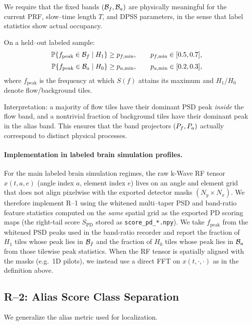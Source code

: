 We require that the fixed bands $(\mathcal{B}_f,\mathcal{B}_a)$ are physically meaningful for the current PRF, slow--time length $T$, and DPSS parameters, in the sense that label statistics show actual occupancy.

On a held--out labeled sample:
\begin{align}
\mathbb{P}\!\left\{f_{\mathrm{peak}}\in\mathcal{B}_f \;\middle|\; H_1\right\} &\ge p_{f,\min},\qquad p_{f,\min}\in [0.5,0.7],\\[0.5ex]
\mathbb{P}\!\left\{f_{\mathrm{peak}}\in\mathcal{B}_a \;\middle|\; H_0\right\} &\ge p_{a,\min},\qquad p_{a,\min}\in [0.2,0.3],
\end{align}
where $f_{\mathrm{peak}}$ is the frequency at which $S(f)$ attains its maximum and $H_1$/$H_0$ denote flow/background tiles.

Interpretation: a majority of flow tiles have their dominant PSD peak \emph{inside} the flow band, and a nontrivial fraction of background tiles have their dominant peak in the alias band. This ensures that the band projectors $(P_f,P_a)$ actually correspond to distinct physical processes.

\paragraph{Implementation in labeled brain simulation profiles.}
For the main labeled brain simulation regimes, the raw k-Wave RF tensor $x(t,a,e)$ (angle index $a$, element index $e$) lives on an angle and element grid that does not align pixelwise with the exported detector masks $(N_y\times N_x)$. We therefore implement R--1 using the whitened multi--taper PSD and band-ratio feature statistics computed on the \emph{same} spatial grid as the exported PD scoring maps (the right-tail score $S_{\mathrm{PD}}$ stored as \texttt{score\_pd\_*.npy}). We take $f_{\mathrm{peak}}$ from the whitened PSD peaks used in the band-ratio recorder and report the fraction of $H_1$ tiles whose peak lies in $\mathcal{B}_f$ and the fraction of $H_0$ tiles whose peak lies in $\mathcal{B}_a$ from those tilewise peak statistics. When the RF tensor is spatially aligned with the masks (e.g.\ 1D pilots), we instead use a direct FFT on $x(t,\cdot,\cdot)$ as in the definition above.

\subsection{R--2: Alias Score Class Separation}

We generalize the alias metric used for localization.

